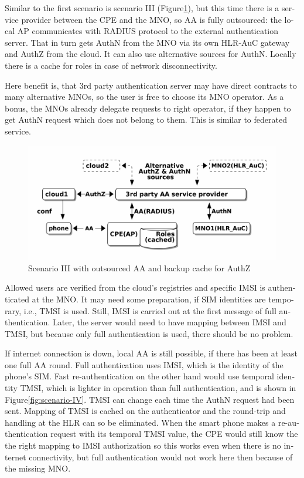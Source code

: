 \documentclass[12pt,a4paper,english]{tutthesis}
\begin{document}
\begin{otherlanguage}{english}
\label{scenario-iii}

Similar to the first scenario is scenario III (Figure\ref{fig:scenario-III}), 
but this time there is a service provider between the CPE and the MNO, so AA is fully outsourced:
the local AP communicates with RADIUS protocol to the external
authentication server. That in turn gets AuthN from the MNO via its own
HLR-AuC gateway and AuthZ from the cloud. It can also use alternative
sources for AuthN.
Locally there is a cache for roles in case of network disconnectivity.

Here benefit is, that 3rd party authentication server may have direct
contracts to many alternative MNOs, so the user is free to choose its
MNO operator. As a bonus,  the MNOs already delegate requests to right
operator, if they happen to get AuthN request which does not belong to
them. This is similar to federated service.

\begin{figure}[htb]
\centering
\includegraphics[width=.9\linewidth]{scenIII.png}
\caption{\label{fig:scenario-III}Scenario III with outsourced AA and backup cache for AuthZ}
\end{figure}

Allowed users are verified from the cloud's registries and specific IMSI is
authenticated at the MNO.  It may need some preparation, if SIM
identities are temporary, i.e., TMSI is used.  Still, IMSI is carried
out at the first message 
of full authentication. Later, the server would need to have mapping
between IMSI and TMSI, but because only full authentication is used,
there should be no problem.



If internet connection is down, local AA is still possible, if there
has been at least one full AA round.
Full authentication uses IMSI, which is the identity of the phone's
SIM.  Fast re-authentication on the other hand would 
use temporal identity TMSI, which is lighter in operation than full
authentication, and is shown in Figure\ref{fig:scenario-IV}. TMSI can
change each time the AuthN request had been sent. Mapping of TMSI is
cached on the authenticator and the round-trip and handling at the HLR can
so be eliminated.  When the smart phone makes a re-authentication
request with its temporal TMSI value, the CPE would still know the
the right mapping to IMSI authorization so this works
even when there is no internet connectivity, but full authentication
would not work here then because of the missing MNO.



\end{otherlanguage}
\end{document}
